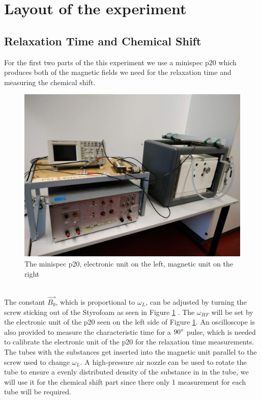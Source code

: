 \section{Layout of the experiment}\label{layout-of-the-experiment}
\subsection{Relaxation Time and Chemical Shift}\label{lay1}
For the first two parts of the this experiment we use a minispec p20 which produces both of the magnetic fields we need for the relaxation time and measuring the chemical shift. \\
\begin{figure}[h!]
	\centering
	\includegraphics[scale=0.18]{images/minispec_p20.jpg}
	\caption{The minispec p20, electronic unit on the left, magnetic unit on the right}
	\label{mini}
\end{figure} \\
The constant $\vec{B_0}$, which is proportional to $\omega_{L}$, can be adjusted by turning the screw sticking out of the Styrofoam as seen in Figure \ref{mini} . The $\omega_{HF}$ will be set by the electronic unit of the p20 seen on the left side of Figure \ref{mini}. An oscilloscope is also provided to measure the characteristic time for a $90\degree$ pulse, which is needed to calibrate the electronic unit of the p20 for the relaxation time measurements. The tubes with the substances get inserted into the magnetic unit parallel to the screw used to change $\omega_{L}$. A high-pressure air nozzle can be used to rotate the tube to ensure a evenly distributed density of the substance in in the tube, we will use it for the chemical shift part since there only 1 measurement for each tube will be required. \\
